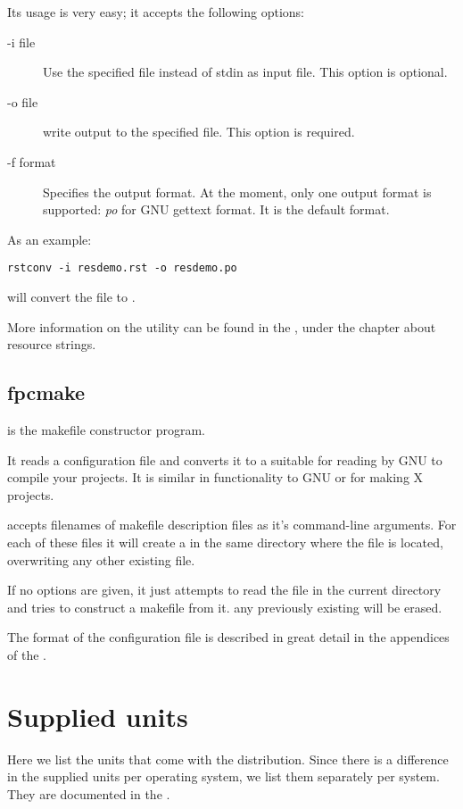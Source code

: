 \documentclass{book}
\begin{document}
Its usage is very easy; it accepts the following options:
\begin{description}
\item[-i file] Use the specified file instead of stdin as input file. This
option is optional.
\item[-o file] write output to the specified file. This option is required.
\item[-f format] Specifies the output format. At the moment, only one output
format is supported: {\em po} for GNU gettext  format.
It is the default format.
\end{description}
As an example:
\begin{verbatim}
rstconv -i resdemo.rst -o resdemo.po
\end{verbatim}
will convert the  file to .

More information on the  utility can be found in the \progref,
under the chapter about resource strings.

\subsection{fpcmake}

 is the \fpc makefile constructor program.

It reads a  configuration file and converts it to a
 suitable for reading by GNU  to compile
your projects. It is similar in functionality to GNU 
or  for making X projects.

 accepts filenames of makefile description files as it's
command-line arguments. For each of these files it will create a
 in the same directory where the file is located,
overwriting any other existing file.

If no options are given, it just attempts to read the file 
in the current directory and tries to construct a makefile from it.
any previously existing  will be erased.

The format of the  configuration file is described in great
detail in the appendices of the \progref.

\section{Supplied units}
Here we list the units that come with the \fpc distribution. Since there is
a difference in the supplied units per operating system, we list them
separately per system. They are documented in the \unitsref.
\end{document}
